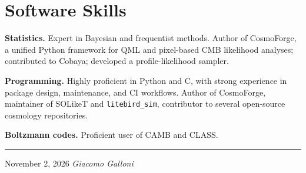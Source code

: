 \documentclass[10pt,a4paper]{article}
\begin{document}
\section*{Software Skills}
\noindent\textbf{Statistics.} Expert in Bayesian and frequentist methods. Author of CosmoForge, a unified Python framework for QML and pixel-based CMB likelihood analyses; contributed to Cobaya; developed a profile-likelihood sampler.\par\vspace{1pt}
\noindent\textbf{Programming.} Highly proficient in Python and C, with strong experience in package design, maintenance, and CI workflows. Author of CosmoForge, maintainer of SOLikeT and \texttt{litebird\_sim}, contributor to several open-source cosmology repositories.\par\vspace{1pt}
\noindent\textbf{Boltzmann codes.} Proficient user of CAMB and CLASS.

\vfill
\noindent\textcolor{rule}{\rule{\linewidth}{0.4pt}}\par\vspace{2pt}
{\footnotesize\textcolor{muted}{November 2, 2026 \hfill \textit{Giacomo Galloni}}}
\end{document}
